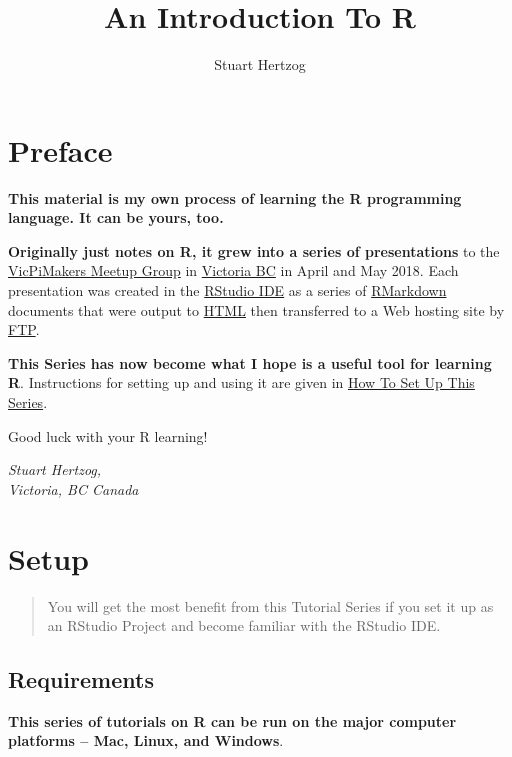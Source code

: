 \documentclass[]{book}
\title{An Introduction To R}
\author{Stuart Hertzog}
\date{}
\theoremstyle{definition}
\theoremstyle{definition}
\theoremstyle{definition}
\theoremstyle{remark}
\begin{document}
\maketitle

{
\setcounter{tocdepth}{1}
\tableofcontents
}
\hypertarget{preface}{%
\chapter*{Preface}\label{preface}}

\textbf{This material is my own process of learning the R programming
language. It can be yours, too.}

\textbf{Originally just notes on R, it grew into a series of
presentations} to the
\href{https://www.meetup.com/Victoria-Raspberry-PiMakers-And-Others/}{VicPiMakers
Meetup Group} in \href{https://www.tourismvictoria.com/}{Victoria BC} in
April and May 2018. Each presentation was created in the
\href{https://www.rstudio.com/}{RStudio IDE} as a series of
\href{http://rmarkdown.rstudio.com/}{RMarkdown} documents that were
output to \href{https://en.wikipedia.org/wiki/HTML}{HTML} then
transferred to a Web hosting site by
\href{https://en.wikipedia.org/wiki/File_Transfer_Protocol}{FTP}.

\textbf{This Series has now become what I hope is a useful tool for
learning R}. Instructions for setting up and using it are given in
\href{setup.html}{How To Set Up This Series}.

Good luck with your R learning!

\emph{Stuart Hertzog,\\
Victoria, BC Canada}

\hypertarget{setup}{%
\chapter{Setup}\label{setup}}

\begin{quote}
You will get the most benefit from this Tutorial Series if you set it up
as an RStudio Project and become familiar with the RStudio IDE.
\end{quote}

\hypertarget{requirements}{%
\section{Requirements}\label{requirements}}

\textbf{This series of tutorials on R can be run on the major computer
platforms -- Mac, Linux, and Windows}.
\end{document}
